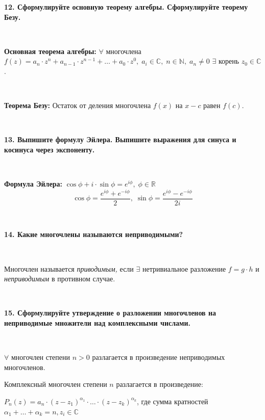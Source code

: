 \documentclass{article}
\begin{document}
	\textbf{12. Сформулируйте основную теорему алгебры. Сформулируйте теорему Безу.}
	
	{
		$\;$
		\setlength{\parindent}{0.4cm}
		\hangindent=0.4cm
		
		\textbf{Основная теорема алгебры:} $\forall$ многочлена $f(z)=a_n\cdot z^n+a_{n-1}\cdot z^{n-1}+\ldots+a_0\cdot z^0, \; a_i\in\mathbb{C}, \; n\in\mathbb{N}, \; a_n\ne0$ $\exists$ корень $z_0\in\mathbb{C}$.
		
		$\;$
		
		\textbf{Теорема Безу:} Остаток от деления многочлена $f(x)$ на $x-c$ равен $f(c)$.
		
		$\;$
		\setlength{\parindent}{0cm}
		\hangindent=0cm
	}
	
	\textbf{13. Выпишите формулу Эйлера. Выпишите выражения для синуса и косинуса через экспоненту.} 
	
	{
		$\;$
		\setlength{\parindent}{0.4cm}
		\hangindent=0.4cm
		
		\textbf{Формула Эйлера:} $\cos\phi+i\cdot\sin\phi=e^{i\phi}, \; \phi\in\mathbb{R}$
		$$\cos\phi=\dfrac{e^{i\phi}+e^{-i\phi}}{2}, \; \sin\phi=\dfrac{e^{i\phi}-e^{-i\phi}}{2i}$$
		
		$\;$
		\setlength{\parindent}{0cm}
		\hangindent=0cm
	}
	
	\textbf{14. Какие многочлены называются неприводимыми?} 	
	
	{
		$\;$
		\setlength{\parindent}{0.4cm}
		\hangindent=0.4cm
		
		Многочлен называется \textit{приводимым,} если $\exists$ нетривиальное разложение $f=g\cdot h$ и \textit{неприводимым} в противном случае.
		
		$\;$
		\setlength{\parindent}{0cm}
		\hangindent=0cm
	}
	
	\textbf{15. Сформулируйте утверждение о разложении многочленов на неприводимые множители над комплексными числами.} 
	
	{
		$\;$
		\setlength{\parindent}{0.4cm}
		\hangindent=0.4cm
		
		$\forall$ многочлен степени $n>0$ разлагается в произведение неприводимых многочленов.
		
		Комплексный многочлен степени $n$ разлагается в произведение:
		
        $P_n(z)=a_n\cdot(z-z_1)^{\alpha_1}\cdot \ldots\cdot(z-z_k)^{\alpha_k}$, где сумма кратностей $\alpha_1+\ldots+\alpha_k=n, z_i\in\mathbb{C}$\\
		
		$\;$
		\setlength{\parindent}{0cm}
		\hangindent=0cm
	}
	
\end{document}
